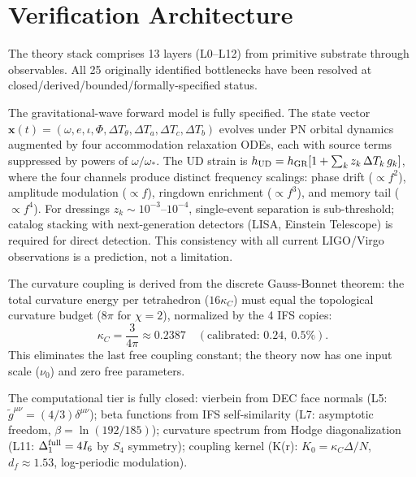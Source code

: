\documentclass[11pt,twocolumn]{article}
\begin{document}
\section{Verification Architecture}
\label{sec:verification}

The theory stack comprises 13 layers (L0--L12) from primitive substrate through observables.
All 25 originally identified bottlenecks have been resolved at closed/derived/bounded/formally-specified status.

The gravitational-wave forward model is fully specified.  The state vector $\mathbf{x}(t) = (\omega, e, \iota, \Phi, \Delta T_\theta, \Delta T_a, \Delta T_c, \Delta T_b)$ evolves under PN orbital dynamics augmented by four accommodation relaxation ODEs, each with source terms suppressed by powers of $\omega/\omega_*$.  The UD strain is $h_{\rm UD} = h_{\rm GR}[1 + \sum_k z_k\,\Delta T_k\,g_k]$, where the four channels produce distinct frequency scalings: phase drift ($\propto f^2$), amplitude modulation ($\propto f$), ringdown enrichment ($\propto f^3$), and memory tail ($\propto f^4$).  For dressings $z_k \sim 10^{-3}$--$10^{-4}$, single-event separation is sub-threshold; catalog stacking with next-generation detectors (LISA, Einstein Telescope) is required for direct detection.  This consistency with all current LIGO/Virgo observations is a prediction, not a limitation.

The curvature coupling is derived from the discrete Gauss-Bonnet theorem: the total curvature energy per tetrahedron ($16\kappa_C$) must equal the topological curvature budget ($8\pi$ for $\chi = 2$), normalized by the 4 IFS copies:
\begin{equation}
\label{eq:kappaC}
\kappa_C = \frac{3}{4\pi} \approx 0.2387 \quad(\text{calibrated: } 0.24,\ 0.5\%).
\end{equation}
This eliminates the last free coupling constant; the theory now has one input scale ($\nu_0$) and zero free parameters.

The computational tier is fully closed: vierbein from DEC face normals\cite{hirani} (L5: $\tilde{g}^{\mu\nu} = (4/3)\delta^{\mu\nu}$); beta functions from IFS self-similarity (L7: asymptotic freedom, $\beta = \ln(192/185)$); curvature spectrum from Hodge diagonalization (L11: $\Delta_1^{\rm full} = 4I_6$ by $S_4$ symmetry); coupling kernel (K(r): $K_0 = \kappa_C\Delta/N$, $d_f \approx 1.53$, log-periodic modulation).
\end{document}
